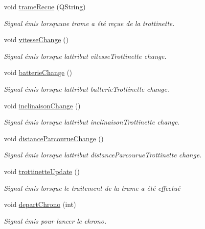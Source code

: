 \begin{DoxyCompactItemize}
void \hyperlink{class_peripherique_local_af980614027f938565b318eb1dfd579c5}{trame\+Recue} (Q\+String)
\begin{DoxyCompactList}\small\item\em Signal émis lorsqu\textquotesingle{}une trame a été reçue de la trottinette. \end{DoxyCompactList}\item 
void \hyperlink{class_peripherique_local_ae00597ad0acf0c5bed53e0b4d216214c}{vitesse\+Change} ()
\begin{DoxyCompactList}\small\item\em Signal émis lorsque l\textquotesingle{}attribut vitesse\+Trottinette change. \end{DoxyCompactList}\item 
void \hyperlink{class_peripherique_local_a19d92cae0098678a5a61f993274687f0}{batterie\+Change} ()
\begin{DoxyCompactList}\small\item\em Signal émis lorsque l\textquotesingle{}attribut batterie\+Trottinette change. \end{DoxyCompactList}\item 
void \hyperlink{class_peripherique_local_a9854fcde7556478f343b4a571864445a}{inclinaison\+Change} ()
\begin{DoxyCompactList}\small\item\em Signal émis lorsque l\textquotesingle{}attribut inclinaison\+Trottinette change. \end{DoxyCompactList}\item 
void \hyperlink{class_peripherique_local_ad5a28dbbf46c2cea6ed4d2c3633578e9}{distance\+Parcourue\+Change} ()
\begin{DoxyCompactList}\small\item\em Signal émis lorsque l\textquotesingle{}attribut distance\+Parcourue\+Trottinette change. \end{DoxyCompactList}\item 
void \hyperlink{class_peripherique_local_af93a0559c563c2a9489a6c78468af6f1}{trottinette\+Update} ()
\begin{DoxyCompactList}\small\item\em Signal émis lorsque le traitement de la trame a été effectué \end{DoxyCompactList}\item 
void \hyperlink{class_peripherique_local_a8c29d255e41df4bc381f4ff2d1451416}{depart\+Chrono} (int)
\begin{DoxyCompactList}\small\item\em Signal émis pour lancer le chrono. \end{DoxyCompactList}\item 

\end{DoxyCompactItemize}
